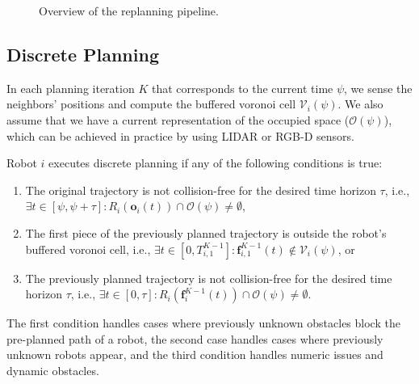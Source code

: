 \documentclass{svproc}
\newcommand{\vf}{\mathbf{f}}
\newcommand{\vo}{\mathbf{o}}
\newcommand{\cV}{\mathcal{V}}
\newcommand{\cO}{\mathcal{O}}
\newcommand{\todo}[1]{\textbf{\textcolor{red}{TODO: #1}}}
\begin{document}
\begin{figure}
{
}
\caption{Overview of the replanning pipeline.
}
\label{fig:flowchart}
\end{figure}


\subsection{Discrete Planning} \label{discretePlanning}

In each planning iteration $K$ that corresponds to the current time $\psi$, we sense the neighbors' positions and compute the buffered voronoi cell $\cV_i(\psi)$.
We also assume that we have a current representation of the occupied space ($\cO(\psi)$), which can be achieved in practice by using LIDAR or RGB-D sensors.

Robot $i$ executes discrete planning if any of the following conditions is true:
\begin{enumerate}
    \item The original trajectory is not collision-free for the desired time horizon $\tau$, i.e., $\exists t\in [\psi,\psi+\tau] : R_i(\vo_i(t)) \cap \cO(\psi) \neq \emptyset$,
    \item The first piece of the previously planned trajectory is outside the robot's buffered voronoi cell, i.e., $\exists t\in [0, T^{K-1}_{i,1}] : \vf^{K-1}_{i,1}(t) \not\in \cV_i(\psi)$, or
    \item The previously planned trajectory is not collision-free for the desired time horizon $\tau$, i.e., $\exists t\in [0,\tau] :  R_i(\vf^{K-1}_i(t)) \cap \cO(\psi) \neq \emptyset$.
\end{enumerate}
The first condition handles cases where previously unknown obstacles block the pre-planned path of a robot, the second case handles cases where previously unknown robots appear, and the third condition handles numeric issues and dynamic obstacles.
\end{document}
